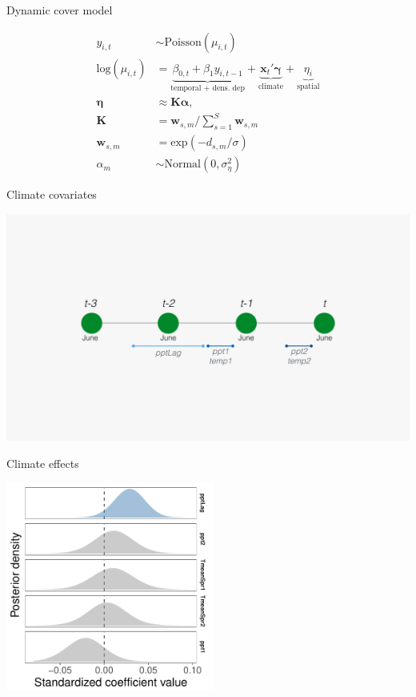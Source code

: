 \documentclass[12pt, compress, aspectratio=1610]{beamer}
\begin{document}
\begin{frame}{%
\protect\hypertarget{dynamic-cover-model-1}{%
Dynamic cover model}}

\small

\begin{align*}
y_{i,t} &\sim \text{Poisson}(\mu_{i,t}) \\
\text{log}(\mu_{i,t}) &= \underbrace{\beta_{0,t} + \beta_{1}y_{i,t-1}}_\text{temporal + dens. dep} + \underbrace{\textbf{x}_{t}'\boldsymbol{\gamma}}_\text{climate} + \underbrace{\eta_{i}}_\text{spatial} \\
\boldsymbol{\eta} &\approx \textbf{K}\boldsymbol{\alpha}, \\
\textbf{K} &= \mathbf{w}_{s,m} / \sum_{s=1}^S \mathbf{w}_{s,m} \\
\mathbf{w}_{s,m} &= \text{exp}\left(-d_{s,m} / \sigma \right) \\
\alpha_{m} &\sim \text{Normal}(0,\sigma_{\eta}^2)
\end{align*}

\end{frame}

\begin{frame}{%
\protect\hypertarget{climate-covariates}{%
Climate covariates}}

\centering

\includegraphics[width=\textwidth]{./figures/ipm_climate_effects.pdf}

\end{frame}

\begin{frame}{%
\protect\hypertarget{climate-effects}{%
Climate effects}}

\centering

\includegraphics[height=2.7in]{./figures/post_climate_covariates.pdf}

\end{frame}
\end{document}
